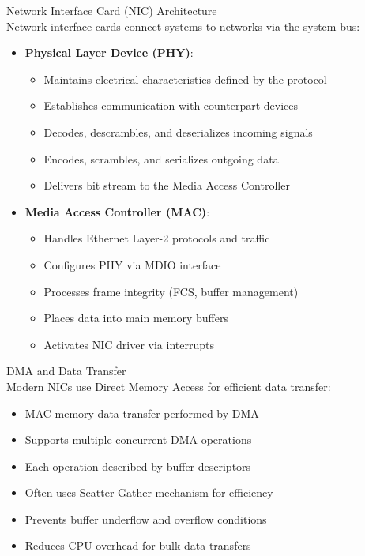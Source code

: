 \begin{definition}{Network Interface Card (NIC) Architecture}\\
    Network interface cards connect systems to networks via the system bus:
    \begin{itemize}
        \item \textbf{Physical Layer Device (PHY)}:
            \begin{itemize}
                \item Maintains electrical characteristics defined by the protocol
                \item Establishes communication with counterpart devices
                \item Decodes, descrambles, and deserializes incoming signals
                \item Encodes, scrambles, and serializes outgoing data
                \item Delivers bit stream to the Media Access Controller
            \end{itemize}
        \item \textbf{Media Access Controller (MAC)}:
            \begin{itemize}
                \item Handles Ethernet Layer-2 protocols and traffic
                \item Configures PHY via MDIO interface
                \item Processes frame integrity (FCS, buffer management)
                \item Places data into main memory buffers
                \item Activates NIC driver via interrupts
            \end{itemize}
    \end{itemize}
\end{definition}

\begin{definition}{DMA and Data Transfer}\\
    Modern NICs use Direct Memory Access for efficient data transfer:
    \begin{itemize}
        \item MAC-memory data transfer performed by DMA
        \item Supports multiple concurrent DMA operations
        \item Each operation described by buffer descriptors
        \item Often uses Scatter-Gather mechanism for efficiency
        \item Prevents buffer underflow and overflow conditions
        \item Reduces CPU overhead for bulk data transfers
    \end{itemize}
\end{definition}


